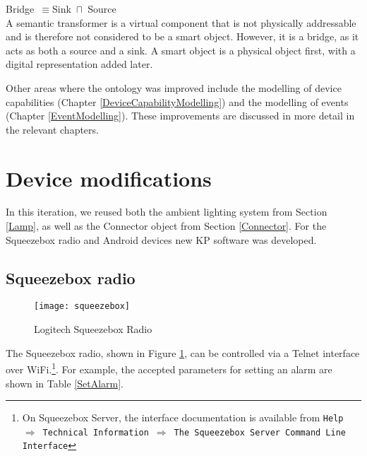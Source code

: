 \noindent Bridge~\ensuremath{\equiv}Sink~\ensuremath{\sqcap}~Source\\ 

A semantic transformer is a virtual component that is not physically addressable and is therefore not considered to be a smart object. However, it is a bridge, as it acts as both a source and a sink. A smart object is a physical object first, with a digital representation added later.

Other areas where the ontology was improved include the modelling of device capabilities (Chapter \ref{DeviceCapabilityModelling}) and the modelling of events (Chapter \ref{EventModelling}). These improvements are discussed in more detail in the relevant chapters. 




\section{Device modifications}

In this iteration, we reused both the ambient lighting system from Section \ref{Lamp}, as well as the Connector object from Section \ref{Connector}. For the Squeezebox radio and Android devices new \ac{KP} software was developed.

\subsection{Squeezebox radio}

\begin{figure}
\centering
\texttt{[image: squeezebox]}
\caption{Logitech Squeezebox Radio}
\label{squeezebox}
\end{figure}

The Squeezebox radio, shown in Figure \ref{squeezebox}, can be controlled via a Telnet interface over WiFi.\footnote{On Squeezebox Server, the interface documentation is available from \texttt{Help}~$\Rightarrow$~\texttt{Technical Information}~$\Rightarrow$~\texttt{The Squeezebox Server Command Line Interface} }. 
For example, the accepted parameters for setting an alarm are shown in Table \ref{SetAlarm}.

